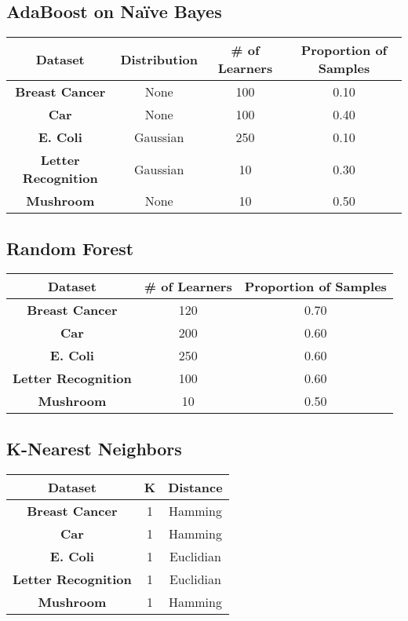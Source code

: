 \documentclass[11pt,titlepage]{article}
\newcommand{\bb}{\textbf}
\begin{document}
\subsection{AdaBoost on Naïve Bayes}
\begin{tabular}{ |c|c|c|c| } \hline
  \bb{Dataset}            & \bb{Distribution} & \bb{\# of Learners} & \bb{Proportion of Samples} \\ \hline
  \bb{Breast Cancer}      & None              & 100                 & 0.10                       \\ \hline
  \bb{Car}                & None              & 100                 & 0.40                       \\ \hline
  \bb{E. Coli}            & Gaussian          & 250                 & 0.10                       \\ \hline
  \bb{Letter Recognition} & Gaussian          & 10                  & 0.30                       \\ \hline
  \bb{Mushroom}           & None              & 10                  & 0.50                       \\ \hline
\end{tabular}

\subsection{Random Forest}
\begin{tabular}{ |c|c|c| } \hline
  \bb{Dataset}            & \bb{\# of Learners} & \bb{Proportion of Samples} \\ \hline
  \bb{Breast Cancer}      & 120                 & 0.70                       \\ \hline
  \bb{Car}                & 200                 & 0.60                       \\ \hline
  \bb{E. Coli}            & 250                 & 0.60                       \\ \hline
  \bb{Letter Recognition} & 100                 & 0.60                       \\ \hline
  \bb{Mushroom}           & 10                  & 0.50                       \\ \hline
\end{tabular}

\subsection{K-Nearest Neighbors}
\begin{tabular}{ |c|c|c| } \hline
  \bb{Dataset}            & \bb{K} & \bb{Distance} \\ \hline
  \bb{Breast Cancer}      & 1      & Hamming       \\ \hline
  \bb{Car}                & 1      & Hamming       \\ \hline
  \bb{E. Coli}            & 1      & Euclidian     \\ \hline
  \bb{Letter Recognition} & 1      & Euclidian     \\ \hline
  \bb{Mushroom}           & 1      & Hamming       \\ \hline
\end{tabular}
\end{document}
